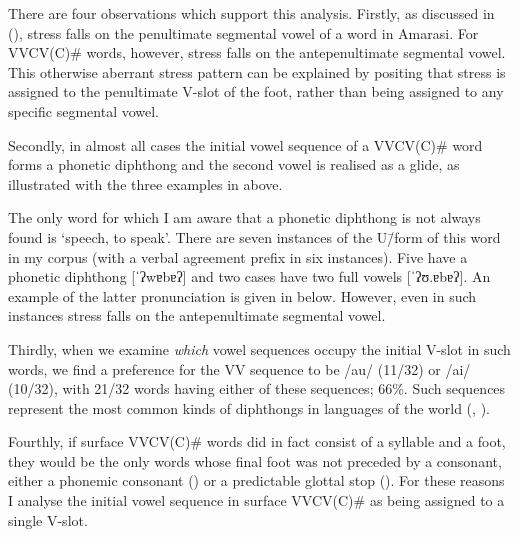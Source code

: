 There are four observations which support this analysis.
Firstly, as discussed in  (),
stress falls on the penultimate segmental vowel of a word in Amarasi.
For VVCV(C){\#} words, however, stress falls on the antepenultimate segmental vowel.
This otherwise aberrant stress pattern can be explained by positing that
stress is assigned to the penultimate V-slot of the foot,
rather than being assigned to any specific segmental vowel.

Secondly, in almost all cases the initial vowel sequence of a VVCV(C){\#}
word forms a phonetic diphthong and the second vowel is realised as a glide,
as illustrated with the three examples in  above.

The only word for which I am aware that a phonetic diphthong
is not always found is  `speech, to speak'.
There are seven instances of the U\=/form of this word in my corpus
(with a verbal agreement prefix in six instances).
Five have a phonetic diphthong [ˈʔwɐbɐʔ]
and two cases have two full vowels [ˈʔʊ.ɐbɐʔ].
An example of the latter pronunciation is given in  below.
However, even in such instances stress falls on the antepenultimate segmental vowel. 

\begin{exe}
\let\eachwordone=\textnormal \let\eachwordtwo=\itshape
	\ex{\glll	[ʔanˈpa\sarc{ɛ}k sɪn \tbr{ˌ}ʔ\tbr{ʊ.ɐ}bɐʔ]\\
						\hp{[ʔ}a|n-paek siin uabaʔ \\
						\hp{[ʔ}{\a\n}-use {\siin} speech	\\
			\glt	\lh{[ʔa|}`{\ldots} using their language' \txrf{130920-1, 4.18}
						{\emb{130920-1-04-18.mp3}{\spk{}}{\apl}}}\label{ex:UsiTheLan}
\end{exe}

Thirdly, when we examine \emph{which} vowel sequences occupy the initial V-slot in such words,
we find a preference for the VV sequence to be /au/ (11/32) or /ai/ (10/32),
with 21/32 words having either of these sequences; 66\%.
Such sequences represent the most common kinds of diphthongs in languages of the world
(\citealt[36]{li86}, \citealt[40]{mi98}).

Fourthly, if surface VVCV(C){\#} words did in fact consist of a syllable and a foot,
they would be the only words whose final foot was not preceded by a consonant,
either a phonemic consonant ()
or a predictable glottal stop ().
For these reasons I analyse the initial vowel sequence
in surface VVCV(C){\#} as being assigned to a single V-slot.


